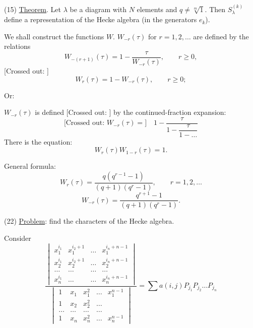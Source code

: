 (15) \underline{Theorem}. Let $\lambda$ be a diagram with $N$ elements and
$q\ne\sqrt[m]{1}$. Then $S_{\lambda}^{(k)}$ define a representation of the Hecke algebra
(in the generators $e_k$).

We shall construct the functions $W$.
$W_{-r}(\tau)$ for $r=1,2,\ldots$ are defined by the relations
\begin{equation}
 W_{-(r+1)}(\tau)=1-\frac{\tau}{W_{-r}(\tau)},\qquad r\geq0,
 \tag{16}
\end{equation}
[Crossed out: ]
\begin{equation}
 W_r(\tau)=1-W_{-r}(\tau),\qquad r\geq0;
 \tag{17}
\end{equation}

Or:

$W_{-r}(\tau)$ is defined
[Crossed out: ]
by the continued-fraction expansion:
\begin{equation}
 \text{[Crossed out: }W_{-r}(\tau)=\text{]}\quad
 1-\frac{\tau}{1-\dfrac{\tau}{1-\ldots}}
 \tag{18}
\end{equation}
There is the equation:
\begin{equation}
 W_r(\tau)W_{1-r}(\tau)=1.
 \tag{19}
\end{equation}

General formula:
\begin{equation}
 W_r(\tau)=\frac{q(q^{r-1}-1)}{(q+1)(q^r-1)},\qquad r=1,2,\ldots
 \tag{20}
\end{equation}
\begin{equation}
 W_{-r}(\tau)=\frac{q^{r+1}-1}{(q+1)(q^r-1)}.
 \tag{21}
\end{equation}

(22) \underline{Problem}: find the characters of the Hecke algebra.

Consider
\begin{equation}
 \frac{
 \begin{vmatrix}
 x_1^{i_1}&x_1^{i_2+1}&\ldots&x_1^{i_n+n-1}\\
 x_2^{i_1}&x_2^{i_2+1}&\ldots&x_2^{i_n+n-1}\\
 \ldots&\ldots&\ldots&\ldots\\
 x_n^{i_1}&\ldots&\ldots&x_n^{i_n+n-1}
 \end{vmatrix}
 }{
 \begin{vmatrix}
 1&x_1&x_1^2&\ldots&x_1^{n-1}\\
 1&x_2&x_2^2&\ldots&\\
 \ldots&\ldots&\ldots&\ldots&\\
 1&x_n&x_n^2&\ldots&x_n^{n-1}
 \end{vmatrix}
 }
 =\sum a(i,j)P_{j_1}P_{j_2}\ldots P_{j_n}
 \tag{23}
\end{equation}


